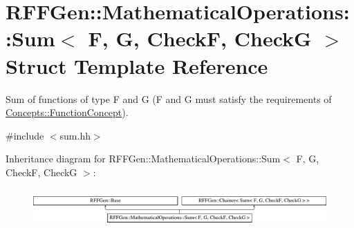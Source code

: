 \hypertarget{structRFFGen_1_1MathematicalOperations_1_1Sum}{\section{R\-F\-F\-Gen\-:\-:Mathematical\-Operations\-:\-:Sum$<$ F, G, Check\-F, Check\-G $>$ Struct Template Reference}
\label{structRFFGen_1_1MathematicalOperations_1_1Sum}
}


Sum of functions of type F and G (F and G must satisfy the requirements of \hyperlink{structRFFGen_1_1Concepts_1_1FunctionConcept}{Concepts\-::\-Function\-Concept}).  




{\ttfamily \#include $<$sum.\-hh$>$}

Inheritance diagram for R\-F\-F\-Gen\-:\-:Mathematical\-Operations\-:\-:Sum$<$ F, G, Check\-F, Check\-G $>$\-:\begin{figure}[H]
\begin{center}
\leavevmode
\includegraphics[height=1.414141cm]{structRFFGen_1_1MathematicalOperations_1_1Sum}
\end{center}
\end{figure}
